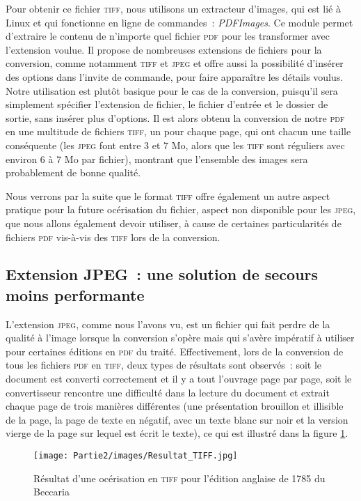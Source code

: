 Pour obtenir ce fichier \textsc{tiff}, nous utilisons un extracteur d'images, qui est lié à Linux et qui fonctionne en ligne de commandes~: \emph{PDFImages}. Ce module permet d'extraire le contenu de n'importe quel fichier \textsc{pdf} pour les transformer avec l'extension voulue. Il propose de nombreuses extensions de fichiers pour la conversion, comme notamment \textsc{tiff} et \textsc{jpeg} et offre aussi la possibilité d'insérer des options dans l'invite de commande, pour faire apparaître les détails voulus. Notre utilisation est plutôt basique pour le cas de la conversion, puisqu'il sera simplement spécifier l'extension de fichier, le fichier d'entrée et le dossier de sortie, sans insérer plus d'options. Il est alors obtenu la conversion de notre \textsc{pdf} en une multitude de fichiers \textsc{tiff}, un pour chaque page, qui ont chacun une taille conséquente (les \textsc{jpeg} font entre 3 et 7 Mo, alors que les \textsc{tiff} sont réguliers avec environ 6 à 7 Mo par fichier), montrant que l'ensemble des images sera probablement de bonne qualité.

Nous verrons par la suite que le format \textsc{tiff} offre également un autre aspect pratique pour la future océrisation du fichier, aspect non disponible pour les \textsc{jpeg}, que nous allons également devoir utiliser, à cause de certaines particularités de fichiers \textsc{pdf} vis-à-vis des \textsc{tiff} lors de la conversion.

\subsection{Extension JPEG~: une solution de secours moins performante}
L'extension \textsc{jpeg}, comme nous l'avons vu, est un fichier qui fait perdre de la qualité à l'image lorsque la conversion s'opère mais qui s'avère impératif à utiliser pour certaines éditions en \textsc{pdf} du traité. Effectivement, lors de la conversion de tous les fichiers \textsc{pdf} en \textsc{tiff}, deux types de résultats sont observés~: soit le document est converti correctement et il y a tout l'ouvrage page par page, soit le convertisseur rencontre une difficulté dans la lecture du document et extrait chaque page de trois manières différentes (une présentation brouillon et illisible de la page, la page de texte en négatif, avec un texte blanc sur noir et la version vierge de la page sur lequel est écrit le texte), ce qui est illustré dans la figure \ref{fig:resultatTIFF}. 
\begin{figure}[p]
    \centering
    \texttt{[image: Partie2/images/Resultat\_TIFF.jpg]}
    \caption{Résultat d'une océrisation en \textsc{tiff} pour l'édition anglaise de 1785 du Beccaria}
    \label{fig:resultatTIFF}
\end{figure}

